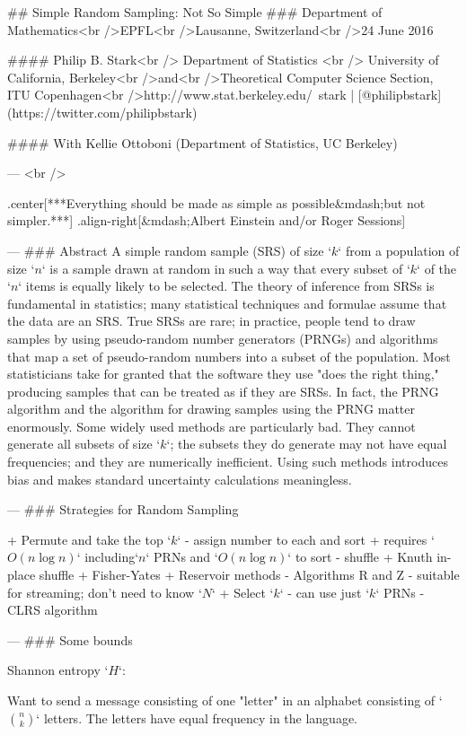 ## Simple Random Sampling: Not So Simple
### Department of Mathematics<br />EPFL<br />Lausanne, Switzerland<br />24 June 2016

#### Philip B. Stark<br /> Department of Statistics <br /> University of California, Berkeley<br />and<br />Theoretical Computer Science Section, ITU Copenhagen<br />http://www.stat.berkeley.edu/~stark | [@philipbstark](https://twitter.com/philipbstark)

#### With Kellie Ottoboni (Department of Statistics, UC Berkeley)

---
<br />

.center[***Everything should be made as simple as possible&mdash;but not simpler.***]
.align-right[&mdash;Albert Einstein and/or Roger Sessions]

---
### Abstract
A simple random sample (SRS) of size `\(k\)` from a population of size `\(n\)` is a sample drawn 
at random in such a way that every subset of `\(k\)` of the `\(n\)` items is equally likely to be selected. 
The theory of inference from SRSs is fundamental in statistics;
many statistical techniques and formulae assume that the data are an SRS.
True SRSs are rare; in practice, people tend to draw samples by using pseudo-random number generators 
(PRNGs) and algorithms that map a set of pseudo-random numbers into a subset of the population. 
Most statisticians take for granted that the software they use "does the right thing," 
producing samples that can be treated as if they are SRSs.
In fact, the PRNG algorithm and the algorithm for drawing samples using the PRNG matter
enormously.
Some widely used methods are particularly bad.
They cannot generate all subsets of size `\(k\)`; the subsets they do generate
may not have equal frequencies; and they are numerically inefficient.
Using such methods introduces bias and makes standard uncertainty calculations meaningless.

---
### Strategies for Random Sampling

+ Permute and take the top `\(k\)`
    - assign number to each and sort
        + requires `\(O(n \log n)\)` including`\(n\)` PRNs and `\(O(n \log n)\)` to sort 
    - shuffle 
        + Knuth in-place shuffle
        + Fisher-Yates
+ Reservoir methods
    - Algorithms R and Z
    - suitable for streaming; don't need to know `\(N\)`
+ Select `\(k\)`
    - can use just `\(k\)` PRNs 
    - CLRS algorithm

---
### Some bounds

Shannon entropy `\(H\)`:

Want to send a message consisting of one "letter" in an alphabet consisting of
`\(n \choose k\)` letters.
The letters have equal frequency in the language.

